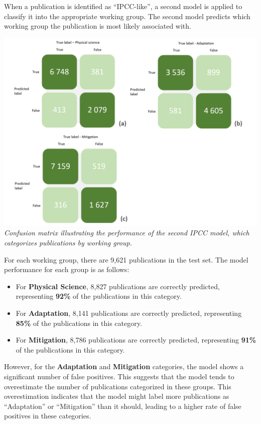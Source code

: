 \documentclass[
]{article}
\providecommand{\tightlist}{%
  \setlength{\itemsep}{0pt}\setlength{\parskip}{0pt}}
\begin{document}
When a publication is identified as ``IPCC-like'', a second model is
applied to classify it into the appropriate working group. The second
model predicts which working group the publication is most likely
associated with.

\includegraphics{./images/teds_ipcc_model_wg.png} \emph{Confusion matrix
illustrating the performance of the second IPCC model, which categorizes
publications by working group.}

For each working group, there are 9,621 publications in the test set.
The model performance for each group is as follows:

\begin{itemize}
\tightlist
\item
  For \textbf{Physical Science}, 8,827 publications are correctly
  predicted, representing \textbf{92\%} of the publications in this
  category.
\item
  For \textbf{Adaptation}, 8,141 publications are correctly predicted,
  representing \textbf{85\%} of the publications in this category.
\item
  For \textbf{Mitigation}, 8,786 publications are correctly predicted,
  representing \textbf{91\%} of the publications in this category.
\end{itemize}

However, for the \textbf{Adaptation} and \textbf{Mitigation} categories,
the model shows a significant number of false positives. This suggests
that the model tends to overestimate the number of publications
categorized in these groups. This overestimation indicates that the
model might label more publications as ``Adaptation'' or ``Mitigation''
than it should, leading to a higher rate of false positives in these
categories.
\end{document}
